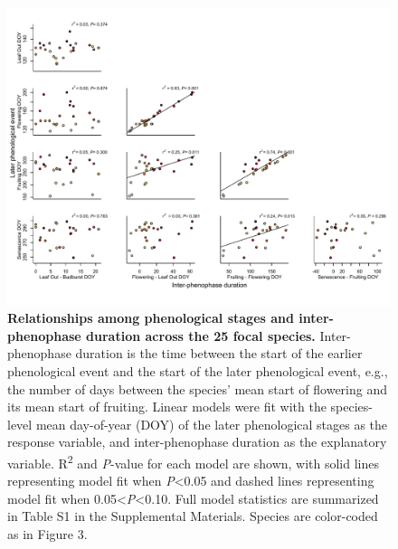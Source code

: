 \documentclass{article}
\begin{document}
\begin{figure}[h]
  \centering
  \includegraphics{../analyses/figures/adj_stagesmegaplot_col_YOR_ripefruit_lowertri.pdf}
  \caption{\textbf{Relationships among phenological stages and inter-phenophase duration across the 25 focal species.} Inter-phenophase duration is the time between the start of the earlier phenological event and the start of the later phenological event, e.g., the number of days between the species' mean start of flowering and its mean start of fruiting. Linear models were fit with the species-level mean day-of-year (DOY) of the later phenological stages as the response variable, and inter-phenophase duration as the explanatory variable. R\textsuperscript{2} and \textit{P}-value for each model are shown, with solid lines representing model fit when \textit{P}<0.05 and dashed lines representing model fit when 0.05<\textit{P}<0.10. Full model statistics are summarized in Table S1 in the Supplemental Materials. Species are color-coded as in Figure 3.}
  \label{fig:inter}
   \end{figure}


\end{document}
